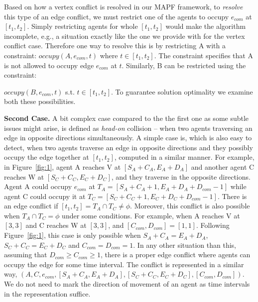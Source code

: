 \documentclass{article}
\begin{document}
Based on how a vertex conflict is resolved in our MAPF framework, to \textit{resolve} this type of an edge conflict, we must restrict one of the agents to occupy $e_{com}$ at $[t_1,t_2]$. 
Simply restricting agents for whole $[t_1,t_2]$ would make the algorithm incomplete, e.g., a situation exactly like the one we provide with for the vertex conflict case.
Therefore one way to resolve this is by restricting A with a constraint: $occupy(A,e_{com},t)$ where $t \in [t_1,t_2]$. The constraint specifies that A is not allowed to occupy edge $e_{com}$ at $t$. 
Similarly, B can be restricted using the constraint: {$occupy(B,e_{com},t)$ s.t. $t \in [t_1,t_2]$. To guarantee solution optimality we examine both these possibilities. 

\noindent \textbf{Second Case.} A bit complex case compared to the the first one as some subtle issues might arise, is defined as \emph{head-on} collision -- when two agents traversing an edge in opposite directions simultaneously. 
A simple case is, which is also easy to detect, when two agents traverse an edge in opposite directions and they possibly occupy the edge together at $[t_1,t_2]$, computed in a similar manner. 
For example, in Figure~\ref{fig:1}, agent A reaches V at $[S_A+C_A,E_A+D_A]$ and another agent C reaches W at $[S_C+C_C,E_C+D_C]$, and they traverse in the opposite directions. Agent A could occupy $e_{com}$ at $T_A = [S_A+C_A+1,E_A+D_A+D_{com}-1]$ while agent C could occupy it at $T_C = [S_C+C_C+1,E_C+D_C+D_{com}-1]$. 
There is an edge conflict if $[t_1,t_2] = T_A \cap T_C \neq \phi$. 
Moreover, this conflict is also possible when $T_A \cap T_C = \phi$ under some conditions. 
For example, when A reaches V at $[3,3]$ and C reaches W at $[3,3]$, and $[C_{com},D_{com}] = [1,1]$. Following Figure~\ref{fig:1}, this case is only possible when $S_A+C_A = E_A+D_A$, $S_C+C_C = E_C+D_C$ and $C_{com}=D_{com}=1$. In any other situation than this, assuming that $D_{com} \geq C_{com} \geq 1$, there is a proper edge conflict where agents can occupy the edge for some time interval. The conflict is represented in a similar way, $(A,C,e_{com},[S_A+C_A,E_A+D_A],[S_C+C_C,E_C+D_C], [C_{com},D_{com}])$. We do not need to mark the direction of movement of an agent as time intervals in the representation suffice. 

}
\end{document}
